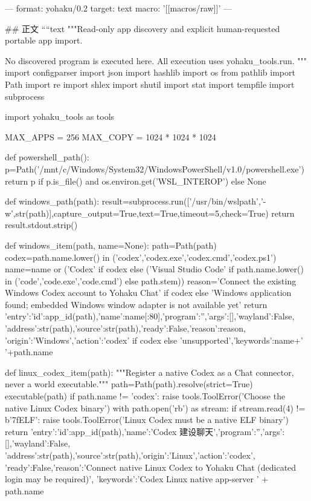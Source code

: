 ---
format: yohaku/0.2
target: text
macro: '[[macros/raw]]'
---

## 正文
````text
"""Read-only app discovery and explicit human-requested portable app import.

No discovered program is executed here. All execution uses yohaku_tools.run.
"""
import configparser
import json
import hashlib
import os
from pathlib import Path
import re
import shlex
import shutil
import stat
import tempfile
import subprocess

import yohaku_tools as tools

MAX_APPS = 256
MAX_COPY = 1024 * 1024 * 1024

def powershell_path():
    p=Path('/mnt/c/Windows/System32/WindowsPowerShell/v1.0/powershell.exe')
    return p if p.is_file() and os.environ.get('WSL_INTEROP') else None

def windows_path(path):
    result=subprocess.run(['/usr/bin/wslpath','-w',str(path)],capture_output=True,text=True,timeout=5,check=True)
    return result.stdout.strip()

def windows_item(path, name=None):
    path=Path(path)
    codex=path.name.lower() in ('codex','codex.exe','codex.cmd','codex.ps1')
    name=name or ('Codex' if codex else ('Visual Studio Code' if path.name.lower() in ('code','code.exe','code.cmd') else path.stem))
    reason='Connect the existing Windows Codex account to Yohaku Chat' if codex else 'Windows application found; embedded Windows window adapter is not available yet'
    return {'entry':{'id':app_id(path),'name':name[:80],'program':'','args':[],'wayland':False},
            'address':str(path),'source':str(path),'ready':False,'reason':reason,
            'origin':'Windows','action':'codex' if codex else 'unsupported','keywords':name+' '+path.name}

def linux_codex_item(path):
    """Register a native Codex as a Chat connector, never a world executable."""
    path=Path(path).resolve(strict=True)
    executable(path)
    if path.name != 'codex':
        raise tools.ToolError('Choose the native Linux Codex binary')
    with path.open('rb') as stream:
        if stream.read(4) != b'\x7fELF':
            raise tools.ToolError('Linux Codex must be a native ELF binary')
    return {'entry':{'id':app_id(path),'name':'Codex 建设聊天','program':'','args':[],'wayland':False},
            'address':str(path),'source':str(path),'origin':'Linux','action':'codex',
            'ready':False,'reason':'Connect native Linux Codex to Yohaku Chat (dedicated login may be required)',
            'keywords':'Codex Linux native app-server ' + path.name}


